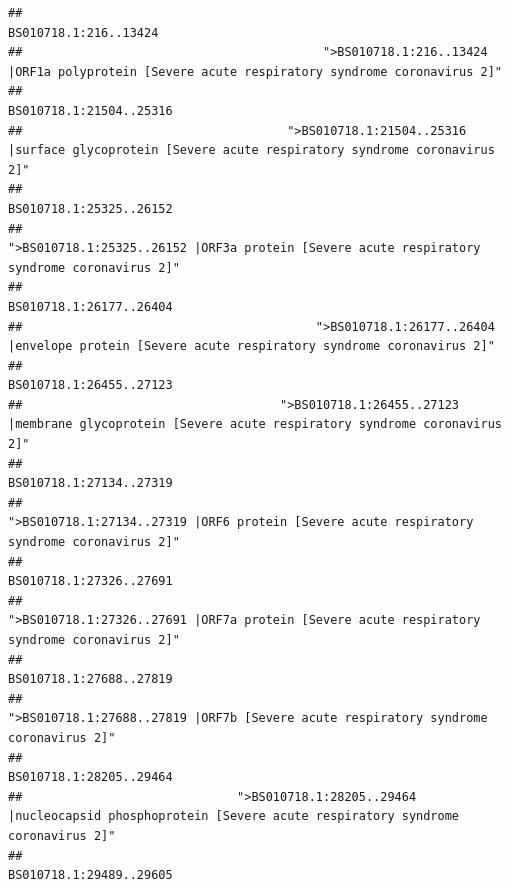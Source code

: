 \documentclass[
]{article}
\begin{document}
\begin{verbatim}
##                                                                                                                  BS010718.1:216..13424 
##                                          ">BS010718.1:216..13424 |ORF1a polyprotein [Severe acute respiratory syndrome coronavirus 2]" 
##                                                                                                                BS010718.1:21504..25316 
##                                     ">BS010718.1:21504..25316 |surface glycoprotein [Severe acute respiratory syndrome coronavirus 2]" 
##                                                                                                                BS010718.1:25325..26152 
##                                            ">BS010718.1:25325..26152 |ORF3a protein [Severe acute respiratory syndrome coronavirus 2]" 
##                                                                                                                BS010718.1:26177..26404 
##                                         ">BS010718.1:26177..26404 |envelope protein [Severe acute respiratory syndrome coronavirus 2]" 
##                                                                                                                BS010718.1:26455..27123 
##                                    ">BS010718.1:26455..27123 |membrane glycoprotein [Severe acute respiratory syndrome coronavirus 2]" 
##                                                                                                                BS010718.1:27134..27319 
##                                             ">BS010718.1:27134..27319 |ORF6 protein [Severe acute respiratory syndrome coronavirus 2]" 
##                                                                                                                BS010718.1:27326..27691 
##                                            ">BS010718.1:27326..27691 |ORF7a protein [Severe acute respiratory syndrome coronavirus 2]" 
##                                                                                                                BS010718.1:27688..27819 
##                                                    ">BS010718.1:27688..27819 |ORF7b [Severe acute respiratory syndrome coronavirus 2]" 
##                                                                                                                BS010718.1:28205..29464 
##                              ">BS010718.1:28205..29464 |nucleocapsid phosphoprotein [Severe acute respiratory syndrome coronavirus 2]" 
##                                                                                                                BS010718.1:29489..29605 

\end{verbatim}
\end{document}
